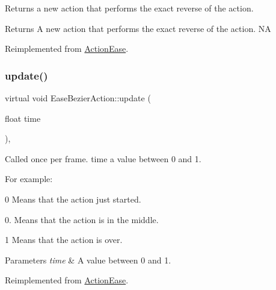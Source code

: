 Returns a new action that performs the exact reverse of the action.

\begin{DoxyReturn}{Returns}
A new action that performs the exact reverse of the action.  NA 
\end{DoxyReturn}


Reimplemented from \hyperlink{classActionEase_ab99eb083fa033fae1d6c948fdc730782}{Action\+Ease}.

\mbox{\label{classEaseBezierAction_aea1d8017627effcd9ad5d228d3e764f1}} 
\subsubsection{\texorpdfstring{update()}{update()}\hspace{0.1cm}{\footnotesize\ttfamily [1/2]}}
{\footnotesize\ttfamily virtual void Ease\+Bezier\+Action\+::update (\begin{DoxyParamCaption}\item[{float}]{time }\end{DoxyParamCaption})\hspace{0.3cm}{\ttfamily [override]}, {\ttfamily [virtual]}}

Called once per frame. time a value between 0 and 1.

For example\+:
\begin{DoxyItemize}
\item 0 Means that the action just started.
\item 0. Means that the action is in the middle.
\item 1 Means that the action is over.
\end{DoxyItemize}


\begin{DoxyParams}{Parameters}
{\em time} & A value between 0 and 1. \\
\hline
\end{DoxyParams}


Reimplemented from \hyperlink{classActionEase_a77679f09c02cf75fb54776470c339fc5}{Action\+Ease}.

\mbox{\label{classEaseBezierAction_a8961e1604d79493c815dc42714261403}} 
